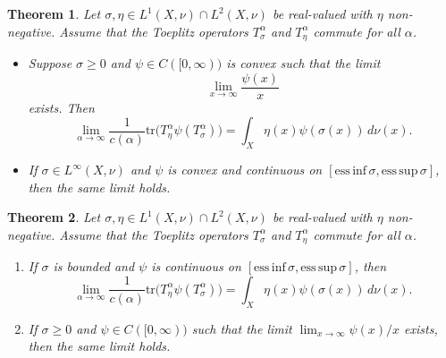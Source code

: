 \documentclass[10pt,a4paper]{amsart}
\newtheorem{thm}{Theorem}
\newcommand{\calF}{\mathcal{F}}
\newcommand{\tr}{\text{tr}} %
\begin{document}
\begin{thm}\label{thm:convex_szego_lc} Let $\sigma,\eta\in L^1(X,\nu)\cap L^2(X,\nu)$ be real-valued with $\eta$ non-negative.
Assume that the Toeplitz operators $T_\sigma^\alpha$ and
$T_\eta^\alpha$ commute for all $\alpha$. 
\leavevmode
\begin{itemize}
\item[(i)] Suppose $\sigma \ge 0$ and $\psi \in C([0,\infty))$
is convex such that the limit
\[
\lim_{x\to\infty} \frac{\psi(x)}{x}
\]
exists. Then
\[
\lim_{\alpha\to\infty}
\frac{1}{c(\alpha)}
\tr\!\big(T_\eta^\alpha \psi(T_\sigma^\alpha)\big)
=
\int_X \eta(x)\psi(\sigma(x))\,d\nu(x).
\]

\item[(ii)] If $\sigma \in L^\infty(X,\nu)$ and
$\psi$ is convex and continuous on
$[\mathrm{ess\,inf}\,\sigma,\mathrm{ess\,sup}\,\sigma]$,
then the same limit holds.
\end{itemize}
\end{thm}

\begin{thm}\label{thm:general_szego_lc}
Let $\sigma,\eta\in L^1(X,\nu)\cap L^2(X,\nu)$ be real-valued with $\eta$ non-negative. Assume that the Toeplitz operators $T_\sigma^\alpha$ and $T_\eta^\alpha$ commute for all $\alpha$.

\begin{enumerate}
\item[(i)] If $\sigma$ is bounded and
$\psi$ is continuous on
$[\mathrm{ess\,inf}\,\sigma,\mathrm{ess\,sup}\,\sigma]$,
then
\[
\lim_{\alpha\to\infty}
\frac{1}{c(\alpha)}
\tr\!\big(T_\eta^\alpha \psi(T_\sigma^\alpha)\big)
=
\int_X \eta(x)\psi(\sigma(x))\, d\nu(x).
\]

\item[(ii)] If $\sigma\ge0$ and
$\psi\in C([0,\infty))$ such that the limit
$\lim_{x\to\infty}\psi(x)/x$ exists,
then the same limit holds.
\end{enumerate}
\end{thm}
\end{document}
